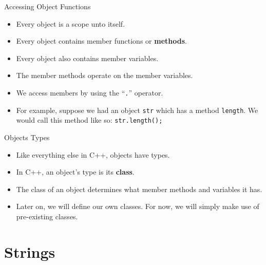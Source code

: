 \documentclass[]{beamer}
\begin{document}
\begin{frame}{Accessing Object Functions}   
    \begin{itemize}[<+->]
        \item Every object is a scope unto itself.
        \item Every object contains member functions or
            \textbf{methods}.
        \item Every object also contains member variables.
        \item The member methods operate on the member variables.
        \item We access members by using the ``\texttt{.}'' operator.
        \item For example, suppose we had an object \texttt{str} which
            has a method \texttt{length}.  We would call this method
            like so:
            \newline\texttt{str.length();}
    \end{itemize}
\end{frame}

\begin{frame}{Objects Types}
    \begin{itemize}[<+->]
        \item Like everything else in C++, objects have types.
        \item In C++, an object's type is its \textbf{class}.
        \item The class of an object determines what member methods
            and variables it has.
        \item Later on, we will define our own classes.  For now, we
            will simply make use of pre-existing classes.
    \end{itemize}
\end{frame}


\section{Strings}
\end{document}

